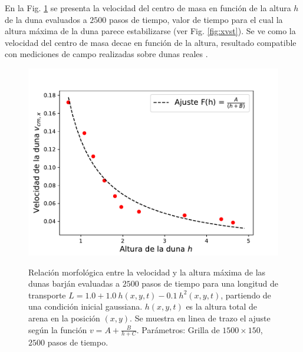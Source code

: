 \documentclass[11pt,twocolumn,twoside]{opticajnl}
\begin{document}
En la Fig. \ref{fig:vvsh} se presenta la velocidad del centro de masa en función de la altura $h$ de la duna evaluados a $2500$ pasos de tiempo, valor de tiempo para el cual la altura máxima de la duna parece estabilizarse (ver Fig. \ref{fig:xvst}). Se ve como la velocidad del centro de masa decae en función de la altura, resultado compatible con mediciones de campo realizadas sobre dunas reales \cite{katsuki_cellular_2011}.

\begin{figure}[H]
\centering
    \includegraphics[width=0.8\linewidth]{Figuras/vvsh.pdf}
        \label{fig:vvsh}
\caption{\centering Relación morfológica entre la velocidad y la altura máxima de las dunas barján evaluadas a $2500$ pasos de tiempo para una longitud de transporte $L = 1.0 + 1.0~h(x,y,t) - 0.1~h^2(x,y,t)$, partiendo de una condición inicial gaussiana. $h(x,y,t)$ es la altura total de arena en la posición $(x,y)$. Se muestra en linea de trazo el ajuste según la función $v = A + \frac{B}{h+C}$. Parámetros: Grilla de $1500 \times 150$, $2500$ pasos de tiempo.}
\label{fig:vvsh}
\end{figure}

\vspace{0.7cm}
\end{document}

